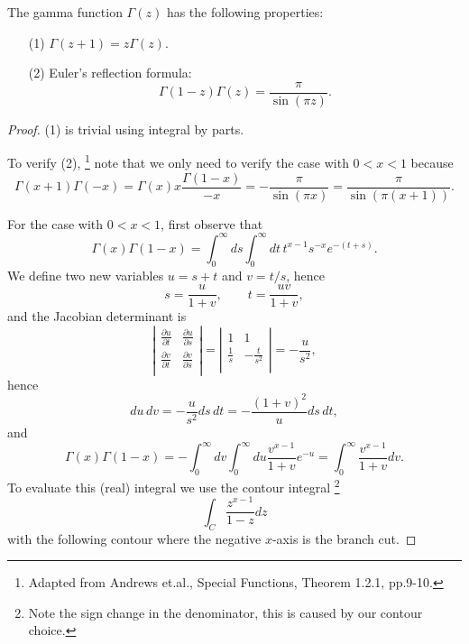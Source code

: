 \begin{proposition} \label{P:gamma_pp}
The gamma function $\Gamma(z)$ has the following properties:
\begin{enumerate}
  \item[(1)] $\Gamma(z+1) = z\Gamma(z)$.
  \item[(2)] Euler's reflection formula:
    \begin{equation}
      \Gamma(1-z) \Gamma(z) = \frac{\pi}{\sin(\pi z)}.
    \end{equation}
\end{enumerate}
\end{proposition}
\begin{proof}
(1) is trivial using integral by parts.

To verify (2), 
\footnote{Adapted from Andrews et.al., Special Functions, Theorem 1.2.1,
    pp.9-10.}
note that we only need to verify the case with $0<x<1$ because
\[
  \Gamma(x+1)\Gamma(-x) = \Gamma(x) x \frac{\Gamma(1-x)}{-x} 
    =-\frac{\pi}{\sin(\pi x)} =\frac{\pi}{\sin(\pi (x+1))}.
\]
   
For the case with $0<x<1$, first observe that 
\[
  \Gamma(x) \Gamma(1-x) 
    = \int_0^{\infty} ds \int_0^{\infty} dt \,
        t^{x-1} s^{-x} e^{-(t+s)}.
\]
We define two new variables $u=s+t$ and $v=t/s$, hence
\[
  s=\frac{u}{1+v}, \qquad t=\frac{uv}{1+v},
\]
and the Jacobian determinant is
\[
  \left| 
    \begin{array}{cc}
      \frac{\partial u}{\partial t} & \frac{\partial u}{\partial s}  \\
      \frac{\partial v}{\partial t} & \frac{\partial v}{\partial s}  \\
    \end{array}
  \right|
  = \left| 
      \begin{array}{cc}
        1 & 1\\
        \frac{1}{s} & -\frac{t}{s^2}  \\
      \end{array}
    \right|
  =  -\frac{u}{s^2},
\]
hence
\[
  du\, dv = -\frac{u}{s^2} ds \, dt
          = -\frac{(1+v)^2}{u} ds \, dt,
\]
and 
\[
  \Gamma(x) \Gamma(1-x) 
    = - \int_0^{\infty} dv \int_0^{\infty} du 
        \frac{v^{x-1}}{1+v} e^{-u}
    = \int_0^{\infty} \frac{v^{x-1}}{1+v} dv.
\]
To evaluate this (real) integral we use the contour integral
\footnote{Note the sign change in the denominator, this is caused by our contour
    choice.}
\[
   \int_C \frac{z^{x-1}}{1-z} dz
\]
with the following contour where the negative $x$-axis is the branch cut.


\end{proof}
